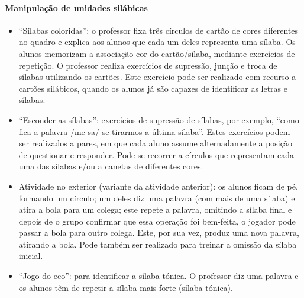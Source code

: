 \documentclass[
  oneside,
  11pt, a4paper,
  footinclude=true,
  headinclude=true,
  cleardoublepage=empty
]{scrbook}
\begin{document}
\paragraph{Manipulação de unidades silábicas}
\begin{itemize}
  \item “Sílabas coloridas”: o professor fixa três círculos de cartão de cores diferentes no quadro e explica aos alunos que cada um deles representa uma sílaba. Os alunos memorizam a associação cor do cartão/sílaba,  mediante  exercícios  de  repetição.  O  professor realiza exercícios de supressão, junção e troca de sílabas utilizando os cartões. Este exercício pode ser realizado com recurso a cartões silábicos, quando os alunos já são capazes de identificar as letras e sílabas.
  \item “Esconder as sílabas”: exercícios de supressão de sílabas, por exemplo, “como fica a palavra /me-sa/ se tirarmos a última sílaba”. Estes exercícios podem ser realizados a pares, em que cada aluno assume alternadamente  a posição de questionar  e responder. Pode-se recorrer a círculos que representam cada uma das sílabas e/ou a canetas de diferentes cores.
  \item Atividade no exterior (variante da atividade anterior): os alunos ficam de pé, formando um círculo; um deles diz uma palavra (com mais de uma sílaba) e atira a bola para um colega; este repete a palavra, omitindo a sílaba final e depois de o grupo confirmar que essa operação foi bem-feita, o jogador pode passar a bola para outro colega. Este, por sua vez, produz uma nova palavra, atirando a bola. Pode também ser realizado para treinar a omissão da sílaba inicial.
  \item “Jogo do eco”: para identificar a sílaba tónica. O professor diz uma palavra e os alunos têm de repetir a sílaba mais forte (sílaba tónica).
\end{itemize}
\end{document}
